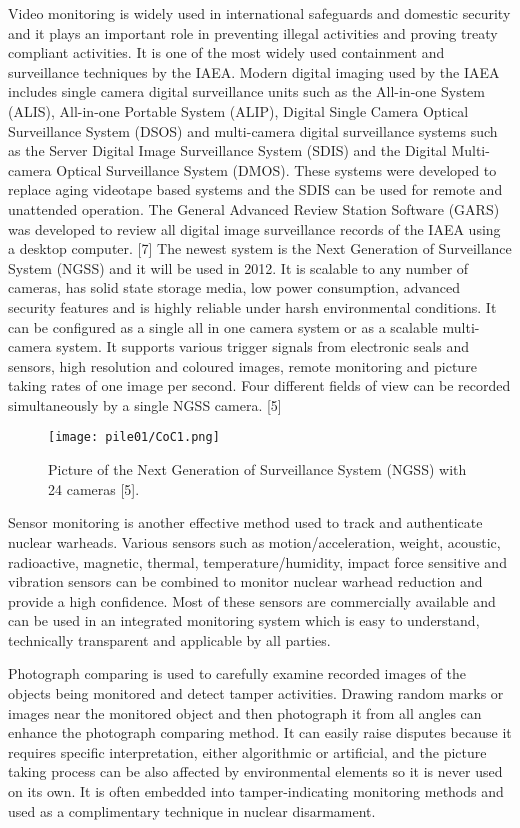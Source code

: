 \documentclass[twocolumn,a4paper]{article}
\begin{document}
Video monitoring is widely used in international safeguards and
domestic security and it plays an important role in preventing illegal
activities and proving treaty compliant activities. It is one of the
most widely used containment and surveillance techniques by the
IAEA. \citep{wuwen2004} Modern digital imaging used by the IAEA
includes single camera digital surveillance units such as the
All-in-one System (ALIS), All-in-one Portable System (ALIP), Digital
Single Camera Optical Surveillance System (DSOS) and multi-camera
digital surveillance systems such as the Server Digital Image
Surveillance System (SDIS) and the Digital Multi-camera Optical
Surveillance System (DMOS). These systems were developed to replace
aging videotape based systems and the SDIS can be used for remote and
unattended operation. The General Advanced Review Station Software
(GARS) was developed to review all digital image surveillance records
of the IAEA using a desktop computer. [7] The newest system is the
Next Generation of Surveillance System (NGSS) and it will be used in
2012. It is scalable to any number of cameras, has solid state storage
media, low power consumption, advanced security features and is highly
reliable under harsh environmental conditions. It can be configured as
a single all in one camera system or as a scalable multi-camera
system. It supports various trigger signals from electronic seals and
sensors, high resolution and coloured images, remote monitoring and
picture taking rates of one image per second. Four different fields of
view can be recorded simultaneously by a single NGSS camera. [5]

\begin{figure}
  \texttt{[image: pile01/CoC1.png]}
  \caption{Picture of the Next Generation of Surveillance System
    (NGSS) with 24 cameras [5].}
\end{figure}

Sensor monitoring is another effective method used to track and
authenticate nuclear warheads.  Various sensors such as
motion/acceleration, weight, acoustic, radioactive, magnetic, thermal,
temperature/humidity, impact force sensitive and vibration sensors can
be combined to monitor nuclear warhead reduction and provide a high
confidence. Most of these sensors are commercially available and can
be used in an integrated monitoring system which is easy to
understand, technically transparent and applicable by all
parties. \citep{wuwen2004}

Photograph comparing is used to carefully examine recorded images of
the objects being monitored and detect tamper activities. Drawing
random marks or images near the monitored object and then photograph
it from all angles can enhance the photograph comparing method. It can
easily raise disputes because it requires specific interpretation,
either algorithmic or artificial, and the picture taking process can
be also affected by environmental elements so it is never used on its
own. It is often embedded into tamper-indicating monitoring methods
and used as a complimentary technique in nuclear
disarmament. \citep{wuwen2004}
\end{document}
